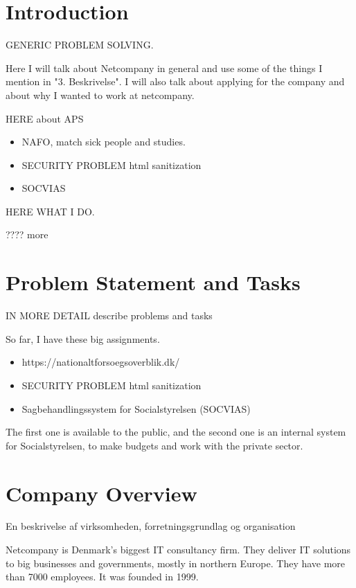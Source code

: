 \documentclass[../main.tex]{subfiles}
\begin{document}
\section{Introduction}

GENERIC PROBLEM SOLVING.  

Here I will talk about Netcompany in general and use some of the things I mention in "3. Beskrivelse". I will also talk about applying for the company and about why I wanted to work at netcompany.  

HERE about APS 

\begin{itemize}
    \item NAFO, match sick people and studies. 
    \item SECURITY PROBLEM html sanitization 
    \item SOCVIAS 
\end{itemize}
HERE WHAT I DO. 


    ???? more 


\section{Problem Statement and Tasks}

IN MORE DETAIL describe problems and tasks 

So far, I have these big assignments. 

\begin{itemize}
    \item  https://nationaltforsoegsoverblik.dk/ 
    \item SECURITY PROBLEM html sanitization 
    \item Sagbehandlingssystem for Socialstyrelsen (SOCVIAS) 
\end{itemize}

The first one is available to the public, and the second one is an internal system for Socialstyrelsen, to make budgets and work with the private sector. 

\section{Company Overview}
En beskrivelse af virksomheden, forretningsgrundlag og organisation 

Netcompany is Denmark's biggest IT consultancy firm. They deliver IT solutions to big businesses and governments, mostly in northern Europe.
They have more than 7000 employees. It was founded in 1999. 
\end{document}
